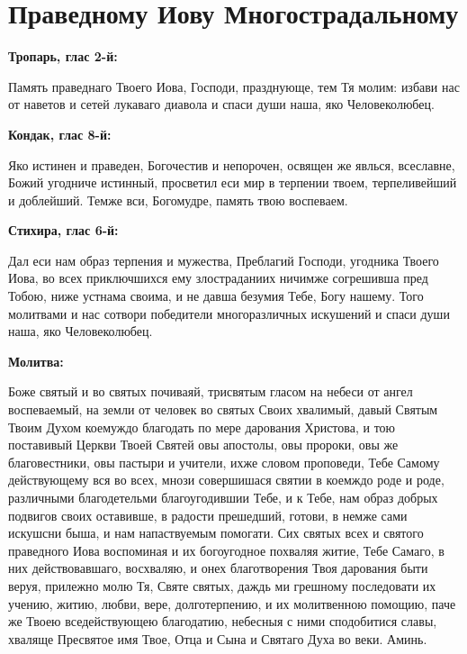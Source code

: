 


 


 
\vspace{-\baselineskip}
\section{Праведному Иову Многострадальному}
 


\bfseries Тропарь, глас 2-й:\normalfont{}\nopagebreak


Память праведнаго Твоего Иова, Господи, празднующе, тем Тя молим: избави нас от наветов и сетей лукаваго диавола и спаси души наша, яко Человеколюбец.


\medskip


\bfseries Кондак, глас 8-й:\normalfont{}\nopagebreak


Яко истинен и праведен, Богочестив и непорочен, освящен же явлься, всеславне, Божий угодниче истинный, просветил еси мир в терпении твоем, терпеливейший и доблейший. Темже вси, Богомудре, память твою воспеваем.


\medskip


\bfseries Стихира, глас 6-й:\normalfont{}\nopagebreak


Дал еси нам образ терпения и мужества, Преблагий Господи, угодника Твоего Иова, во всех приключшихся ему злостраданиих ничимже согрешивша пред Тобою, ниже устнама своима, и не давша безумия Тебе, Богу нашему. Того молитвами и нас сотвори победители многоразличных искушений и спаси души наша, яко Человеколюбец.


\medskip


\bfseries Молитва:\normalfont{}\nopagebreak


Боже святый и во святых почиваяй, трисвятым гласом на небеси от ангел воспеваемый, на земли от человек во святых Своих хвалимый, давый Святым Твоим Духом коемуждо благодать по мере дарования Христова, и тою поставивый Церкви Твоей Святей овы апостолы, овы пророки, овы же благовестники, овы пастыри и учители, ихже словом проповеди, Тебе Самому действующему вся во всех, мнози совершишася святии в коемждо роде и роде, различными благодетельми благоугодившии Тебе, и к Тебе, нам образ добрых подвигов своих оставивше, в радости прешедший, готови, в немже сами искушсни быша, и нам напаствуемым помогати. Сих святых всех и святого праведного Иова  воспоминая и их богоугодное похваляя житие, Тебе Самаго, в них действовавшаго, восхваляю, и онех благотворения Твоя дарования быти веруя, прилежно молю Тя, Святе святых, даждь ми грешному последовати их учению, житию, любви, вере, долготерпению, и их молитвенною помощию, паче же Твоею вседействующею благодатию, небесныя с ними сподобитися славы, хваляще Пресвятое имя Твое, Отца и Сына и Святаго Духа во веки. Аминь.


